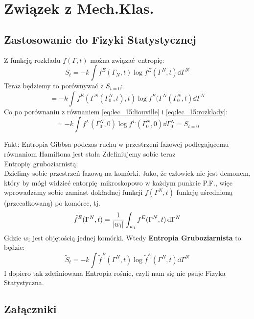 \documentclass[12pt,a4paper]{report}
\newcommand{\subind}[2]{{\color{blue} #1\index{#2}}}
\renewcommand{\emph}{\textbf}
\newenvironment{lecture}[1]{\par\medskip
   \noindent\chapter{#1} \rmfamily}{\medskip}
\begin{document}
\begin{lecture}{Związek z Mech.Klas.}
    \section{Zastosowanie do Fizyki Statystycznej}
    Z funkcją rozkładu $f(\Gamma,t)$ można związać entropię:
    \[
        S_t = - k \int f^E(\Gamma_N, t) \log f^E(\Gamma^N, t) \dd{\Gamma^N}
    \]
    Teraz będziemy to porównywać z $S_{t=0}$:
    \[
        = -k \int f^E(\Gamma^N(\Gamma^N_0, t), t)\log f^E(\Gamma^N(\Gamma^N_0, t) \dd{\Gamma^N}
    \]
    Co po porównaniu z równaniem \eqref{eq:lec_15:liouville} i \eqref{eq:lec_15:rozklady}:
    \[
        = -k \int f^L(\Gamma_0^N, 0)\log f^L(\Gamma_0^N, 0) \dd{\Gamma_0^N} = S_{t=0}
    \]
    
    {\color{Cerulean} Fakt: Entropia Gibbsa podczas ruchu w przestrzeni fazowej podlegającemu równaniom Hamiltona jest stała}
    Zdefiniujemy sobie teraz \subind{Entropię gruboziarnistą}{Entropia!Gruboziarnista}:\\
    Dzielimy sobie przestrzeń fazową na komórki. Jako, że człowiek nie jest demonem, który by mógł widzieć entorpię mikroskopowo w każdym punkcie P.F., więc wprowadzamy sobie zamiast dokładnej funkcji $f(\Gamma^N, t)$ funkcję uśrednioną (przecałkowaną) po komórce, tj. 
    \[
        \tilde{f}^E(\Gamma^N, t) = \frac{1}{\abs{w_i}} \int_{w_i} f^E(\Gamma^N, t)\dd{\Gamma^N}
    \]
    Gdzie $w_i$ jest objętością jednej komórki. Wtedy \emph{Entropia Gruboziarnista} to będzie:
    \begin{equation}
        \tilde{S}_t = - k \int \tilde{f}^E(\Gamma^N, t) \log \tilde{f}^E(\Gamma^N, t) \dd{\Gamma^N}
    \end{equation}
    I dopiero tak zdefiniowana Entropia rośnie, czyli nam się nie psuje Fizyka Statystyczna.
\end{lecture}

\tableofcontents

\listoffigures

\printindex


\begin{center}
    \chapter*{Załączniki}
\end{center}

\appendix
\setcounter{table}{0}
\captionsetup[table]{name=Załącznik}
\captionsetup[figure]{name=Załącznik}
\captionsetup[section]{name=Lecture}
\end{document}
